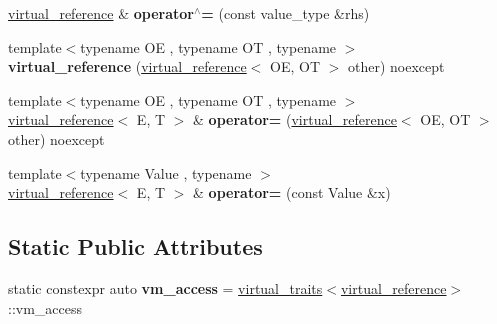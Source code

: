 \begin{DoxyCompactItemize}
\item 
\mbox{\label{classdistant_1_1memory_1_1virtual__reference_aaa76cb144af3d98d50cfcc826d31cbd5}} 
\mbox{\hyperlink{classdistant_1_1memory_1_1virtual__reference}{virtual\+\_\+reference}} \& {\bfseries operator$^\wedge$=} (const value\+\_\+type \&rhs)
\item 
\mbox{\label{classdistant_1_1memory_1_1virtual__reference_a6877c4d5d9728a2585507fc2a4cb2857}} 
{\footnotesize template$<$typename OE , typename OT , typename $>$ }\\{\bfseries virtual\+\_\+reference} (\mbox{\hyperlink{classdistant_1_1memory_1_1virtual__reference}{virtual\+\_\+reference}}$<$ OE, OT $>$ other) noexcept
\item 
\mbox{\label{classdistant_1_1memory_1_1virtual__reference_a707f1268d986e8a94985fbc5a28a824c}} 
{\footnotesize template$<$typename OE , typename OT , typename $>$ }\\\mbox{\hyperlink{classdistant_1_1memory_1_1virtual__reference}{virtual\+\_\+reference}}$<$ E, T $>$ \& {\bfseries operator=} (\mbox{\hyperlink{classdistant_1_1memory_1_1virtual__reference}{virtual\+\_\+reference}}$<$ OE, OT $>$ other) noexcept
\item 
\mbox{\label{classdistant_1_1memory_1_1virtual__reference_a89391719d337fe7387fa772a574ab402}} 
{\footnotesize template$<$typename Value , typename $>$ }\\\mbox{\hyperlink{classdistant_1_1memory_1_1virtual__reference}{virtual\+\_\+reference}}$<$ E, T $>$ \& {\bfseries operator=} (const Value \&x)
\end{DoxyCompactItemize}
\subsection*{Static Public Attributes}
\begin{DoxyCompactItemize}
\item 
\mbox{\label{classdistant_1_1memory_1_1virtual__reference_a35d50a515cc6b37dd7372b28ba6e163c}} 
static constexpr auto {\bfseries vm\+\_\+access} = \mbox{\hyperlink{structdistant_1_1memory_1_1virtual__traits}{virtual\+\_\+traits}}$<$\mbox{\hyperlink{classdistant_1_1memory_1_1virtual__reference}{virtual\+\_\+reference}}$>$\+::vm\+\_\+access
\end{DoxyCompactItemize}
